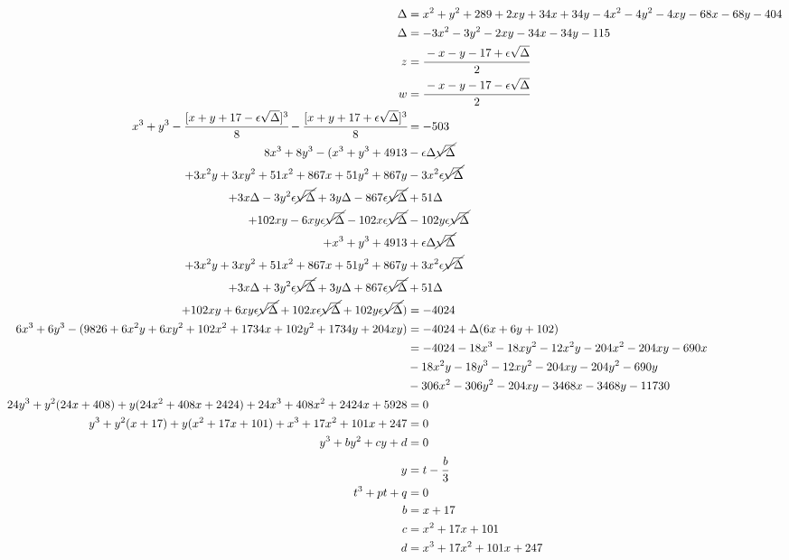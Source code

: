 \documentclass[11pt,a4paper]{article}
\begin{document}
\begin{align}
\Delta &= x^2 + y^2 + 289 + 2xy + 34x + 34y - 4x^2 - 4 y^2 - 4xy - 68x - 68y - 404 \\
\Delta &= -3 x^2 -3 y^2 - 2xy - 34x - 34y - 115 \\
z &= \cfrac{- x - y - 17 + \epsilon \sqrt{\Delta}}{2} \\
w &= \cfrac{-x - y - 17 - \epsilon \sqrt{\Delta}}{2} \\
x^3 + y^3 - \cfrac{[x + y + 17 - \epsilon \sqrt{\Delta}]^3}{8} - \cfrac{[x + y + 17 + \epsilon \sqrt{\Delta}]^3}{8} &= - 503 \\
8 x^3 + 8 y^3 - (x^3 + y^3 + 4913 &- \epsilon \Delta \cancel{\sqrt{\Delta}} \\
+ 3x^2 y + 3x y^2 + 51 x^2 + 867x + 51 y^2 + 867y &- 3x^2 \epsilon \cancel{\sqrt{\Delta}} \\
+ 3x \Delta - 3y^2 \epsilon \cancel{\sqrt{\Delta}} + 3y \Delta - 867 \epsilon \cancel{\sqrt{\Delta}} &+ 51 \Delta \\
+ 102xy - 6 xy \epsilon \cancel{\sqrt{\Delta}} - 102x \epsilon \cancel{\sqrt{\Delta}} &- 102y \epsilon \cancel{\sqrt{\Delta}} \\
+ x^3 + y^3 + 4913 &+ \epsilon \Delta \cancel{\sqrt{\Delta}} \\
+ 3x^2 y + 3x y^2 + 51 x^2 + 867x + 51 y^2 + 867y &+ 3x^2 \epsilon \cancel{\sqrt{\Delta}} \\
+ 3x \Delta + 3y^2 \epsilon \cancel{\sqrt{\Delta}} + 3y \Delta + 867 \epsilon \cancel{\sqrt{\Delta}} &+ 51 \Delta \\
+ 102xy + 6 xy \epsilon \cancel{\sqrt{\Delta}} + 102x \epsilon \cancel{\sqrt{\Delta}} + 102y \epsilon \cancel{\sqrt{\Delta}}) &= -4024 \\
6 x^3 + 6 y^3 - (9826 + 6x^2 y + 6x y^2 + 102 x^2 + 1734x + 102 y^2 + 1734y + 204xy) &= - 4024 + \Delta (6x + 6y + 102) \\
&= - 4024 -18 x^3 -18 xy^2 - 12x^2y - 204x^2 - 204xy - 690x \\
&-18 x^2y -18 y^3 - 12xy^2 - 204xy - 204y^2 - 690y \\
&-306 x^2 -306 y^2 - 204xy - 3468x - 3468y - 11730 \\
24 y^3 + y^2 (24 x + 408) + y (24x^2 + 408x + 2424) + 24 x^3 + 408x^2 + 2424x + 5928 &= 0 \\
y^3 + y^2 (x + 17) + y (x^2 + 17 x + 101) + x^3 + 17x^2 + 101x + 247 &= 0 \\
y^3 + b y^2 + c y + d &= 0 \\
y &= t - \cfrac{b}{3} \\
t^3 + pt + q &= 0 \\
b &= x + 17 \\
c &= x^2 + 17 x + 101 \\
d &= x^3 + 17x^2 + 101x + 247
\end{align}
\end{document}
